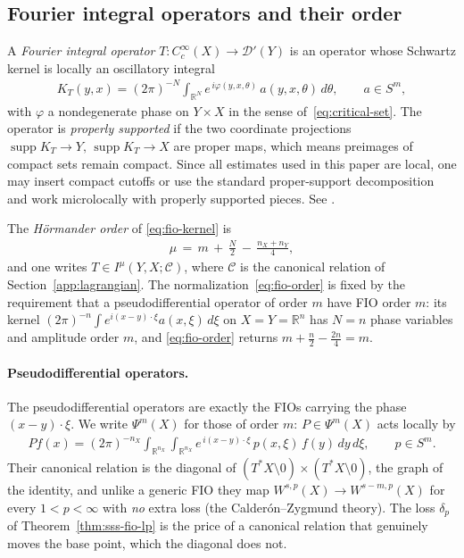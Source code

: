 \documentclass[12pt]{article}
\numberwithin{equation}{section}
\numberwithin{figure}{section}
\numberwithin{equation}{section}
\newcommand{\R}{\mathbb{R}}
\begin{document}
\subsection{Fourier integral operators and their order}
\label{app:order}

A \emph{Fourier integral operator} $T:C_c^\infty(X)\to\mathcal D'(Y)$ is an
operator whose Schwartz kernel is locally an oscillatory integral
\begin{align}
    K_T(y,x)=(2\pi)^{-N}\int_{\R^N}e^{\,i\varphi(y,x,\theta)}\,a(y,x,\theta)\,d\theta,
    \qquad a\in S^m,
    \label{eq:fio-kernel}
\end{align}
with $\varphi$ a nondegenerate phase on $Y\times X$ in the sense
of~\eqref{eq:critical-set}.  The operator is \emph{properly supported} if the two
coordinate projections
$\operatorname{supp}K_T\to Y, \, \operatorname{supp}K_T\to X$
are proper maps, which means preimages of compact sets remain compact.
Since all estimates used in this paper are
local, one may insert compact cutoffs or use the standard proper-support
decomposition and work microlocally with properly supported pieces. See
\cite{sogge_FourierIntegralsClassical_2017,
hormander_LagrangianDistributionsFourier_2009}.

The \emph{H\"ormander order} of \eqref{eq:fio-kernel} is
\cite{hormander_LagrangianDistributionsFourier_2009}
\begin{align}
    \mu \,=\, m\,+\,\frac N2\,-\,\frac{n_X+n_Y}{4},
    \label{eq:fio-order}
\end{align}
and one writes $T\in I^\mu(Y,X;\mathcal{C})$, where $\mathcal{C}$ is the canonical relation of
Section~\ref{app:lagrangian}.  The normalization~\eqref{eq:fio-order} is fixed by the
requirement that a pseudodifferential operator of order $m$ have FIO order $m$:
its kernel $(2\pi)^{-n}\!\int e^{i(x-y)\cdot\xi}a(x,\xi)\,d\xi$ on $X=Y=\R^n$ has
$N=n$ phase variables and amplitude order $m$, and \eqref{eq:fio-order} returns
$m+\tfrac n2-\tfrac{2n}{4}=m$.

\paragraph{Pseudodifferential operators.}
The pseudodifferential operators are exactly the FIOs carrying the phase
$(x-y)\cdot\xi$.  We write $\Psi^m(X)$ for those of order $m$: $P\in\Psi^m(X)$ acts
locally by
\begin{align*}
    Pf(x)=(2\pi)^{-n_X}\int_{\R^{n_X}}\int_{\R^{n_X}}
    e^{\,i(x-y)\cdot\xi}\,p(x,\xi)\,f(y)\,dy\,d\xi,
    \qquad p\in S^m.
\end{align*}
Their canonical relation is the diagonal of
$(T^*X\setminus0)\times(T^*X\setminus0)$, the graph of the identity, and unlike a
generic FIO they map $W^{s,p}(X)\to W^{s-m,p}(X)$ for every $1<p<\infty$ with
\emph{no} extra loss (the Calder\'on--Zygmund theory). The loss $\delta_p$ of
Theorem~\ref{thm:sss-fio-lp} is the price of a canonical relation that genuinely
moves the base point, which the diagonal does not.
\end{document}
